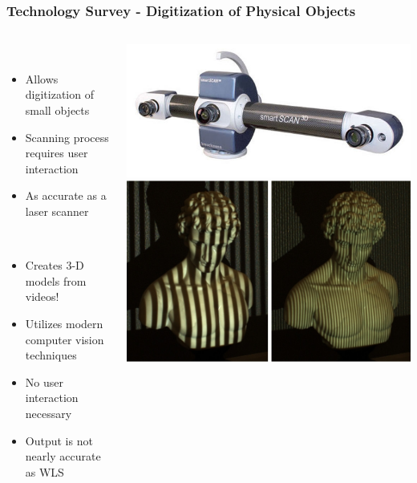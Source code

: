 \begin{frame}
  \frametitle{Technology Survey - Digitization of Physical Objects}
  \begin{columns}
    \begin{column}{0.7\textwidth}
      \begin{description}[]
        \item[White Light Scanner] \hfill \\
        \begin{itemize}
          \item Allows digitization of small objects
          \item Scanning process requires user interaction
          \item As accurate as a laser scanner
        \end{itemize}
       	\item[Structure From Motion] \hfill \\
       	\begin{itemize}
       	  \item Creates 3-D models from videos!
       	  \item Utilizes modern computer vision techniques
       	  \item No user interaction necessary
       	  \item Output is not nearly accurate as WLS
       	\end{itemize}
      \end{description}
   	\end{column} 	
   	\begin{column}{0.3\textwidth}
   	  \includegraphics[width=1\textwidth]{images/scanner}\\
   	  \bigskip
   	  \includegraphics[width=1\textwidth]{images/light_scan}\\

\end{column}
\end{columns}
\end{frame}
